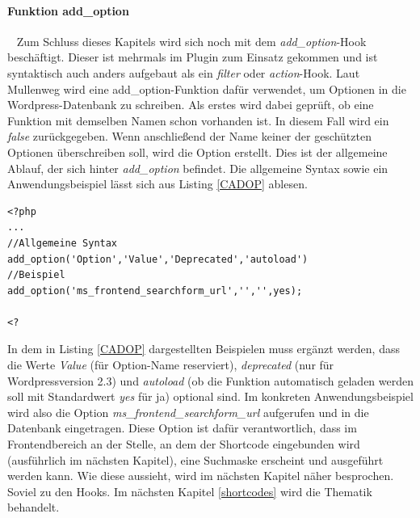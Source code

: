 \paragraph{Funktion add\_option}\ \newline
Zum Schluss dieses Kapitels wird sich noch mit dem \emph{add\_option}-Hook beschäftigt. Dieser ist mehrmals im Plugin zum Einsatz gekommen und ist syntaktisch auch anders aufgebaut als ein \emph{filter} oder \emph{action}-Hook.\newline
Laut Mullenweg wird eine add\_option-Funktion dafür verwendet, um Optionen in die Wordpress-Datenbank zu schreiben.
Als erstes wird dabei geprüft, ob eine Funktion mit demselben Namen schon vorhanden ist. In diesem Fall wird ein \emph{false}  zurückgegeben.\newline
Wenn anschließend der Name keiner der geschützten Optionen überschreiben soll, wird die Option erstellt. Dies ist der allgemeine Ablauf, der sich hinter \emph{add\_option} befindet. Die allgemeine Syntax sowie ein Anwendungsbeispiel lässt sich aus Listing \ref{CADOP} ablesen.\newline
{}
\begin{lstlisting}
<?php
...
//Allgemeine Syntax 
add_option('Option','Value','Deprecated','autoload')
//Beispiel
add_option('ms_frontend_searchform_url','','',yes);

<?
\end{lstlisting}
In dem in Listing \ref{CADOP} dargestellten Beispielen muss ergänzt werden, dass die Werte \emph{Value} (für Option-Name reserviert), \emph{deprecated} (nur für Wordpressversion 2.3) und \emph{autoload} (ob die Funktion automatisch geladen werden soll mit Standardwert \emph{yes} für ja) optional sind.\newline
Im konkreten Anwendungsbeispiel wird also die Option \emph{ms\_frontend\_searchform\_url} aufgerufen und in die Datenbank eingetragen. Diese Option ist dafür verantwortlich, dass im Frontendbereich an der Stelle, an dem der Shortcode eingebunden wird (ausführlich im nächsten Kapitel), eine Suchmaske erscheint und ausgeführt werden kann.\newline
Wie diese aussieht, wird im nächsten Kapitel näher besprochen.\newline
Soviel zu den Hooks. Im nächsten Kapitel \ref{shortcodes} wird die Thematik  behandelt.